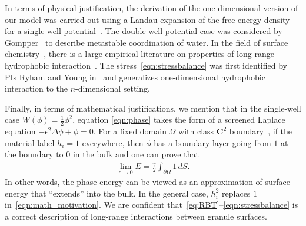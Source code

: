 In terms of physical justification, the derivation of the
one-dimensional version of our model was carried out using a Landau
expansion of the free energy density for a single-well
potential~\cite{MaRa76, ErLjCl89}. The double-well potential case was
considered by Gompper~\cite{GoHaKo94} to describe metastable
coordination of water. In the field of surface
chemistry~\cite{Israelachvili1954}, there is a large empirical
literature on properties of long-range hydrophobic
interaction~\cite{LeRaPa77, KoNa15, Nagle17, Lum1999, Lin2005,
Meyer2006, Ducker2016, Jackson2016, Gletal88, Aketal17, Ch05}. The
stress~\eqref{eqn:stressbalance} was first identified by PIs Ryham and
Young in~\cite{Fu2018_SIAM} and generalizes one-dimensional hydrophobic
interaction to the $n$-dimensional setting. 

Finally, in terms of mathematical justifications, we mention that in the
single-well case $W(\phi) = \tfrac{1}{2}\phi^2$, equation
\eqref{eqn:phase} takes the form of a screened Laplace equation
$-\epsilon^2 \Delta \phi + \phi =0$. For a fixed domain $\Omega$ with
class $\mathbf{C}^2$ boundary~\cite{}, if the material label $h_i = 1$
everywhere, then $\phi$ has a boundary layer going from $1$ at the
boundary to $0$ in the bulk and one can prove that 
\begin{align}
\label{eqn:math_motivation}
\lim_{\epsilon \to 0} E = \frac{\gamma}{2} \int_{\partial \Omega} 1 \,dS.
\end{align}
In other words, the phase energy can be viewed as an approximation of
surface energy that ``extends'' into the bulk. In the general case,
$h_i^2$ replaces $1$ in~\eqref{eqn:math_motivation}. We are confident
that~\eqref{eq:RBT}--\eqref{eqn:stressbalance} is a correct description
of long-range interactions between granule surfaces.

